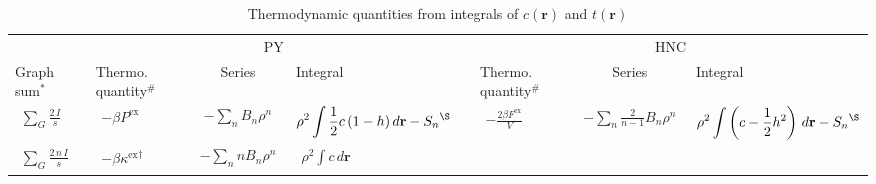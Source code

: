 \documentclass[aip,jcp,reprint,superscriptaddress]{revtex4-1}
\newcommand{\vct}[1]{\mathbf{#1}}
\providecommand{\vr}{} %
\renewcommand{\vr}{\vct{r}}
\newcommand{\supex}[1]{ { { #1 }^{ \mathrm{ex} } } }
\newcommand{\Pex}{\supex{P}}
\newcommand{\Fex}{\supex{F}}
\newcommand{\kex}{\supex{\kappa}}
\begin{document}
\begin{table*}
\setlength{\tabcolsep}{2pt}
\caption{
  Thermodynamic quantities from integrals of $c(\vr)$ and $t(\vr)$
}
\label{tab:thermodyn}
\begin{tabular}{p{1.3cm} p{1.2cm} c l r p{1.6cm} c l}
  \hline
  \hline
  \noalign{\smallskip}
  \phantom
  &
  \multicolumn{3}{c}{PY}
  &
  \phantom &
  \multicolumn{3}{c}{HNC}
  \\[-2mm]
  \cline{2-4}
  \cline{6-8}
  \noalign{\smallskip}
  Graph sum$^*$
  &
  Thermo. quantity$^\#$ &
  Series &
  Integral &
  &
  Thermo. quantity$^\#$ &
  Series &
  Integral
  \\
  \noalign{\smallskip}
  \hline
  \noalign{\smallskip}
  $\begin{aligned} \sum_G \frac{ 2 \, I }{ s } \end{aligned}$ &
  $\begin{aligned} -\beta \Pex \end{aligned}$
  &
  $\begin{aligned} -\sum_n B_n \rho^n \end{aligned}$
  &
  $\begin{aligned} \rho^2 \int \frac{1}{2} c \, (1 - h) \, d\vr
    - {S_n}^\S \end{aligned}$
  &
  &
  $\begin{aligned} -\frac{ 2 \beta \Fex }{ V } \end{aligned}$
  &
  $\begin{aligned} - \sum_n \frac{ 2 }{ n - 1 } B_n \rho^n \end{aligned}$
  &
  $\begin{aligned} \rho^2 \int \left( c - \frac{1}{2} h^2 \right) \, d\vr
    - {S_n}^\S \end{aligned}$
  \\
  \noalign{\smallskip}
  $\begin{aligned} \sum_G \frac{ 2 \, n \, I }{ s } \end{aligned}$ &
  $\begin{aligned} -\beta \kex^\dagger \end{aligned}$
  &
  $\begin{aligned} -\sum_n n B_n \rho^n \end{aligned}$
  &
  $\begin{aligned} \rho^2 \int c \, d\vr \end{aligned}$

\end{tabular}
\end{table*}
\end{document}
